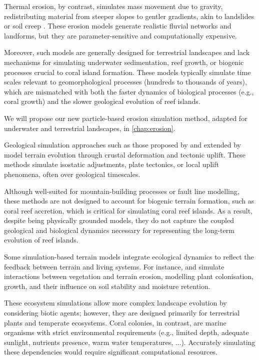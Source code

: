 Thermal erosion, by contrast, simulates mass movement due to gravity, redistributing material from steeper slopes to gentler gradients, akin to landslides or soil creep \cite{Benes2006}. These erosion models generate realistic fluvial networks and landforms, but they are parameter-sensitive and computationally expensive.

Moreover, such models are generally designed for terrestrial landscapes and lack mechanisms for simulating underwater sedimentation, reef growth, or biogenic processes crucial to coral island formation. These models typically simulate time scales relevant to geomorphological processes (hundreds to thousands of years), which are mismatched with both the faster dynamics of biological processes (e.g., coral growth) and the slower geological evolution of reef islands.

We will propose our new particle-based erosion simulation method, adapted for underwater and terrestrial landscapes, in \cref{chap:erosion}.


Geological simulation approaches such as those proposed by \cite{Cordonnier2016, Cordonnier2017a} and extended by \cite{Schott2023} model terrain evolution through crustal deformation and tectonic uplift. These methods simulate isostatic adjustments, plate tectonics, or local uplift phenomena, often over geological timescales.

Although well-suited for mountain-building processes or fault line modelling, these methods are not designed to account for biogenic terrain formation, such as coral reef accretion, which is critical for simulating coral reef islands. As a result, despite being physically grounded models, they do not capture the coupled geological and biological dynamics necessary for representing the long-term evolution of reef islands.


Some simulation-based terrain models integrate ecological dynamics to reflect the feedback between terrain and living systems. For instance, \cite{Ecormier-Nocca2021} and \cite{Cordonnier2017b} simulate interactions between vegetation and terrain erosion, modelling plant colonisation, growth, and their influence on soil stability and moisture retention.

These ecosystem simulations allow more complex landscape evolution by considering biotic agents; however, they are designed primarily for terrestrial plants and temperate ecosystems. Coral colonies, in contrast, are marine organisms with strict environmental requirements (e.g., limited depth, adequate sunlight, nutrients presence, warm water temperatures, ...). Accurately simulating these dependencies would require significant computational resources.


